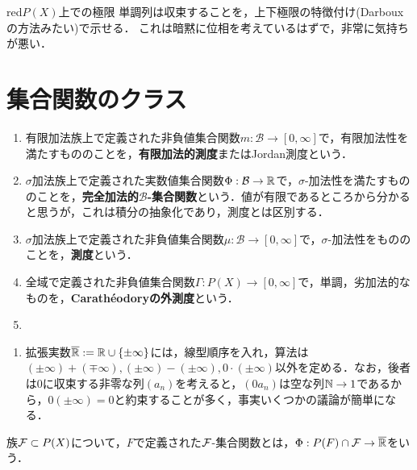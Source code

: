 \documentclass[uplatex, dvipdfmx]{jsreport}
\renewcommand{\B}{\mathcal{B}}
\begin{document}
\begin{tbox}{red}{$P(X)$上での極限}
    単調列は収束することを，上下極限の特徴付け(Darbouxの方法みたい)で示せる．
    これは暗黙に位相を考えているはずで，非常に気持ちが悪い．
\end{tbox}

\section{集合関数のクラス}

\begin{tcolorbox}[colframe=ForestGreen, colback=ForestGreen!10!white,breakable,colbacktitle=ForestGreen!40!white,coltitle=black,fonttitle=\bfseries\sffamily,
    title=]
    \begin{enumerate}
        \item 有限加法族上で定義された非負値集合関数$m:\B\to[0,\infty]$で，有限加法性を満たすもののことを，\textbf{有限加法的測度}またはJordan測度という．
        \item $\sigma$加法族上で定義された実数値集合関数$\Phi:\B\to\R$で，$\sigma$-加法性を満たすもののことを，\textbf{完全加法的$\B$-集合関数}という．値が有限であるところから分かると思うが，これは積分の抽象化であり，測度とは区別する．
        \item $\sigma$加法族上で定義された非負値集合関数$\mu:\B\to[0,\infty]$で，$\sigma$-加法性をもののことを，\textbf{測度}という．
        \item 全域で定義された非負値集合関数$\Gamma:P(X)\to[0,\infty]$で，単調，劣加法的なものを，\textbf{Carathéodoryの外測度}という．
        \item 
    \end{enumerate}
\end{tcolorbox}

\begin{definition}\mbox{}
    \begin{enumerate}
        \item 拡張実数$\overline{\mathbb{R}}:=\mathbb{R}\cup\{\pm\infty\}$には，線型順序を入れ，算法は$(\pm\infty)+(\mp\infty),(\pm\infty)-(\pm\infty),0\cdot(\pm\infty)$以外を定める．なお，後者は$0$に収束する非零な列$(a_n)$を考えると，$(0a_n)$は空な列$\mathbb{N}\to 1$であるから，$0(\pm\infty)=0$と約束することが多く，事実いくつかの議論が簡単になる．
    \end{enumerate}
    族$\mathcal{F}\subset P(X)$について，$F$で定義された$\mathcal{F}$-集合関数とは，$\Phi:P(F)\cap\mathcal{F}\to\overline{\mathbb{R}}$をいう．
\end{definition}
\end{document}
